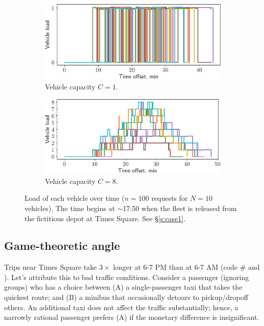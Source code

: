 \documentclass[12pt,notitlepage]{article}
\begin{document}
\begin{figure}[!p]
	\begin{subfigure}{0.5\textwidth}
		\includegraphics[width=\textwidth]{20210616-OPT1/c_grid_study0/UTC-20210619-074952/plots/8/vehicle_load}
		\caption{Vehicle capacity $C = 1$.}
	\end{subfigure}
	\begin{subfigure}{0.5\textwidth}
		\includegraphics[width=\textwidth]{20210616-OPT1/c_grid_study0/UTC-20210619-074952/plots/9/vehicle_load}
		
		\caption{Vehicle capacity $C = 8$.}
	\end{subfigure}
	
	\caption{%
		Load of each vehicle over time
		($n = 100$ requests for $N = 10$ vehicles).
		The time begins at $\sim$17:50 
		when the fleet is released 
		from the fictitious depot
		at Times Square.
		See \S\ref{s:case1}.
	}
	\label{f:case1-load}
\end{figure}




\subsection{Game-theoretic angle}

Trips near Times Square
take $3\times$ longer
at 6-7 PM than at 6-7 AM
(code \#\codetriptime\xspace and ).
%
%
Let's attribute this to bad traffic conditions.
%
%
Consider a passenger
(ignoring groups)
who has a choice between 
(A) a single-passenger taxi that takes the quickest route; and 
(B) a minibus that occasionally detours to pickup/dropoff others.
%
%
An additional taxi does not affect the traffic substantially;
hence, 
a narrowly rational passenger prefers (A)
if the monetary difference is insignificant.
\end{document}

